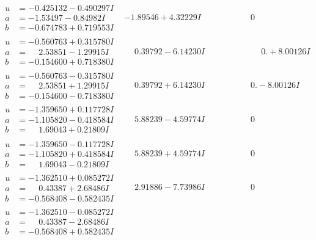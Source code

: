 \documentclass[1p]{elsarticle_modified}
\theoremstyle{definition}
\begin{document}
$$\begin{array}{c|c|c}
\begin{aligned}
u &= -0.425132 - 0.490297 I \\
a &= -1.53497 - 0.84982 I \\
b &= -0.674783 + 0.719553 I\end{aligned}
 & -1.89546 + 4.32229 I & \phantom{-0.000000 } 0 \\ \hline\begin{aligned}
u &= -0.560763 + 0.315780 I \\
a &= \phantom{-}2.53851 - 1.29915 I \\
b &= -0.154600 + 0.718380 I\end{aligned}
 & \phantom{-}0.39792 - 6.14230 I & \phantom{-0.000000 -}0. + 8.00126 I \\ \hline\begin{aligned}
u &= -0.560763 - 0.315780 I \\
a &= \phantom{-}2.53851 + 1.29915 I \\
b &= -0.154600 - 0.718380 I\end{aligned}
 & \phantom{-}0.39792 + 6.14230 I & \phantom{-0.000000 } 0. - 8.00126 I \\ \hline\begin{aligned}
u &= -1.359650 + 0.117728 I \\
a &= -1.105820 - 0.418584 I \\
b &= \phantom{-}1.69043 + 0.21809 I\end{aligned}
 & \phantom{-}5.88239 - 4.59774 I & \phantom{-0.000000 } 0 \\ \hline\begin{aligned}
u &= -1.359650 - 0.117728 I \\
a &= -1.105820 + 0.418584 I \\
b &= \phantom{-}1.69043 - 0.21809 I\end{aligned}
 & \phantom{-}5.88239 + 4.59774 I & \phantom{-0.000000 } 0 \\ \hline\begin{aligned}
u &= -1.362510 + 0.085272 I \\
a &= \phantom{-}0.43387 + 2.68486 I \\
b &= -0.568408 - 0.582435 I\end{aligned}
 & \phantom{-}2.91886 - 7.73986 I & \phantom{-0.000000 } 0 \\ \hline\begin{aligned}
u &= -1.362510 - 0.085272 I \\
a &= \phantom{-}0.43387 - 2.68486 I \\
b &= -0.568408 + 0.582435 I\end{aligned}

\end{array}$$
\end{document}

